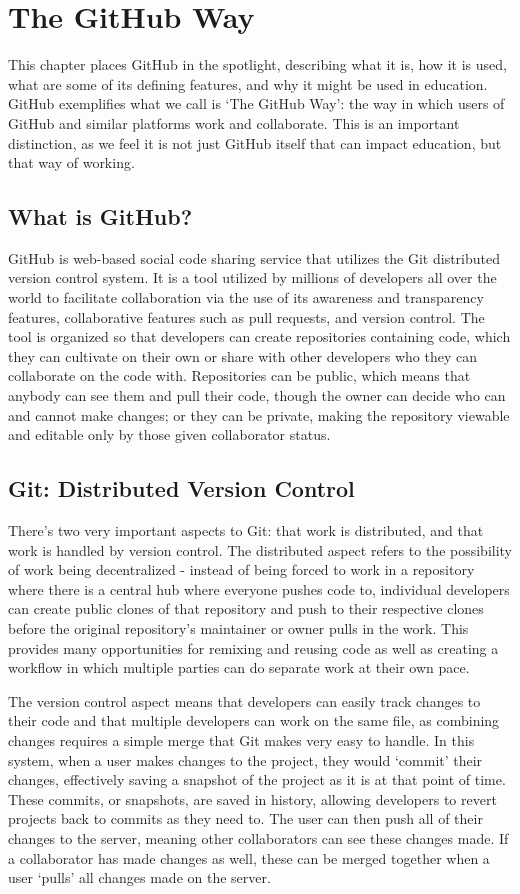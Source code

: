 \chapter{The GitHub Way}
This chapter places GitHub in the spotlight, describing what it is, how it is used, what are some of its defining features, and why it might be used in education. GitHub exemplifies what we call is `The GitHub Way': the way in which users of GitHub and similar platforms work and collaborate. This is an important distinction, as we feel it is not just GitHub itself that can impact education, but that way of working.

\section{What is GitHub?}
GitHub is web-based social code sharing service that utilizes the Git distributed version control system. It is a tool utilized by millions of developers all over the world to facilitate collaboration via the use of its awareness and transparency features, collaborative features such as pull requests, and version control. The tool is organized so that developers can create repositories containing code, which they can cultivate on their own or share with other developers who they can collaborate on the code with. Repositories can be public, which means that anybody can see them and pull their code, though the owner can decide who can and cannot make changes; or they can be private, making the repository viewable and editable only by those given collaborator status.

\section{Git: Distributed Version Control}
There's two very important aspects to Git: that work is distributed, and that work is handled by version control. The distributed aspect refers to the possibility of work being decentralized - instead of being forced to work in a repository where there is a central hub where everyone pushes code to, individual developers can create public clones of that repository and push to their respective clones before the original repository's maintainer or owner pulls in the work. This provides many opportunities for remixing and reusing code as well as creating a workflow in which multiple parties can do separate work at their own pace.

The version control aspect means that developers can easily track changes to their code and that multiple developers can work on the same file, as combining changes requires a simple merge that Git makes very easy to handle. In this system, when a user makes changes to the project, they would `commit' their changes, effectively saving a snapshot of the project as it is at that point of time. These commits, or snapshots, are saved in history, allowing developers to revert projects back to commits as they need to. The user can then push all of their changes to the server, meaning other collaborators can see these changes made. If a collaborator has made changes as well, these can be merged together when a user `pulls' all changes made on the server.

